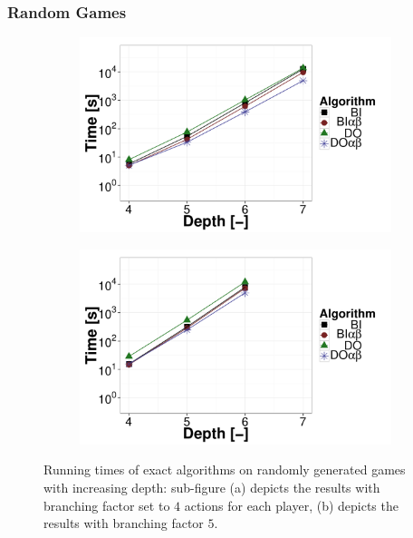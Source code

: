 \subsubsection{Random Games}
\begin{figure}[t]
\centering
	\begin{subfigure}{0.49\textwidth}
		\includegraphics[width=1\textwidth]{figures/RG-BF4-BIN-FALSE.pdf}\caption{}\label{fig:off:res:rgbf4}
	\end{subfigure}
	\begin{subfigure}{0.49\textwidth}
		\includegraphics[width=1\textwidth]{figures/RG-BF5-BIN-FALSE.pdf}\caption{}\label{fig:off:res:rgbf5}
	\end{subfigure}
\caption{Running times of exact algorithms on randomly generated games with increasing depth: sub-figure (a) depicts the results with branching factor set to $4$ actions for each player, (b) depicts the results with branching factor $5$.} \label{fig:off:res:rg}
\end{figure}

